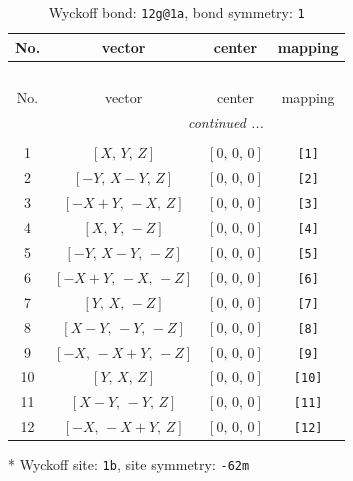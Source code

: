 \documentclass[fleqn,8pt]{jsarticle}
\begin{document}
\begin{longtable}{cccc}
\caption{Wyckoff bond: {\tt 12g@1a}, bond symmetry: {\tt 1}}
 \\
 \hline \hline
No. & vector & center & mapping \\ \hline \endfirsthead

\multicolumn{3}{l}{\tablename\ \thetable{}} \\
 \hline \hline
No. & vector & center & mapping \\ \hline \endhead

 \hline \hline
\multicolumn{3}{r}{\footnotesize\it continued ...} \\ \endfoot

 \hline \hline
\multicolumn{3}{r}{} \\ \endlastfoot

1 & $\left[ X,\, Y,\, Z \right]$ & $\left[ 0,\, 0,\, 0 \right]$ & {\tt [1]} \\ \hline
2 & $\left[ - Y,\, X - Y,\, Z \right]$ & $\left[ 0,\, 0,\, 0 \right]$ & {\tt [2]} \\ \hline
3 & $\left[ - X + Y,\, - X,\, Z \right]$ & $\left[ 0,\, 0,\, 0 \right]$ & {\tt [3]} \\ \hline
4 & $\left[ X,\, Y,\, - Z \right]$ & $\left[ 0,\, 0,\, 0 \right]$ & {\tt [4]} \\ \hline
5 & $\left[ - Y,\, X - Y,\, - Z \right]$ & $\left[ 0,\, 0,\, 0 \right]$ & {\tt [5]} \\ \hline
6 & $\left[ - X + Y,\, - X,\, - Z \right]$ & $\left[ 0,\, 0,\, 0 \right]$ & {\tt [6]} \\ \hline
7 & $\left[ Y,\, X,\, - Z \right]$ & $\left[ 0,\, 0,\, 0 \right]$ & {\tt [7]} \\ \hline
8 & $\left[ X - Y,\, - Y,\, - Z \right]$ & $\left[ 0,\, 0,\, 0 \right]$ & {\tt [8]} \\ \hline
9 & $\left[ - X,\, - X + Y,\, - Z \right]$ & $\left[ 0,\, 0,\, 0 \right]$ & {\tt [9]} \\ \hline
10 & $\left[ Y,\, X,\, Z \right]$ & $\left[ 0,\, 0,\, 0 \right]$ & {\tt [10]} \\ \hline
11 & $\left[ X - Y,\, - Y,\, Z \right]$ & $\left[ 0,\, 0,\, 0 \right]$ & {\tt [11]} \\ \hline
12 & $\left[ - X,\, - X + Y,\, Z \right]$ & $\left[ 0,\, 0,\, 0 \right]$ & {\tt [12]} \\
\end{longtable}
* Wyckoff site: {\tt 1b}, site symmetry: {\tt -62m}
\renewcommand{\arraystretch}{1.2}
\end{document}
